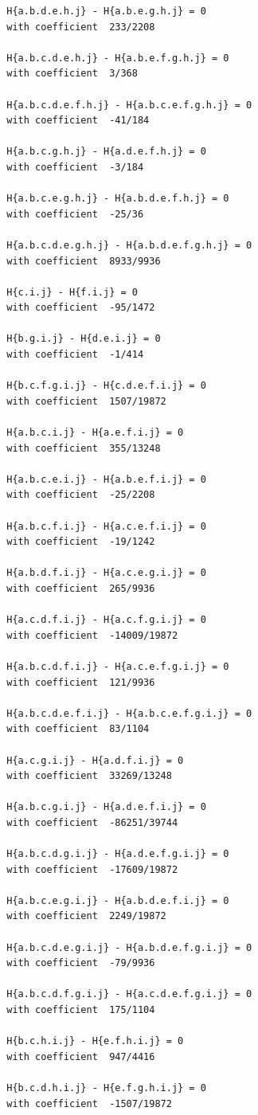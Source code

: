 \documentclass[11pt, a4paper]{kybernetika}
\begin{document}
\begin{verbatim}
		H{a.b.d.e.h.j} - H{a.b.e.g.h.j} = 0
		with coefficient  233/2208
		
		H{a.b.c.d.e.h.j} - H{a.b.e.f.g.h.j} = 0
		with coefficient  3/368
		
		H{a.b.c.d.e.f.h.j} - H{a.b.c.e.f.g.h.j} = 0
		with coefficient  -41/184
		
		H{a.b.c.g.h.j} - H{a.d.e.f.h.j} = 0
		with coefficient  -3/184
		
		H{a.b.c.e.g.h.j} - H{a.b.d.e.f.h.j} = 0
		with coefficient  -25/36
		
		H{a.b.c.d.e.g.h.j} - H{a.b.d.e.f.g.h.j} = 0
		with coefficient  8933/9936
		
		H{c.i.j} - H{f.i.j} = 0
		with coefficient  -95/1472
		
		H{b.g.i.j} - H{d.e.i.j} = 0
		with coefficient  -1/414
		
		H{b.c.f.g.i.j} - H{c.d.e.f.i.j} = 0
		with coefficient  1507/19872
		
		H{a.b.c.i.j} - H{a.e.f.i.j} = 0
		with coefficient  355/13248
		
		H{a.b.c.e.i.j} - H{a.b.e.f.i.j} = 0
		with coefficient  -25/2208
		
		H{a.b.c.f.i.j} - H{a.c.e.f.i.j} = 0
		with coefficient  -19/1242
		
		H{a.b.d.f.i.j} - H{a.c.e.g.i.j} = 0
		with coefficient  265/9936
		
		H{a.c.d.f.i.j} - H{a.c.f.g.i.j} = 0
		with coefficient  -14009/19872
		
		H{a.b.c.d.f.i.j} - H{a.c.e.f.g.i.j} = 0
		with coefficient  121/9936
		
		H{a.b.c.d.e.f.i.j} - H{a.b.c.e.f.g.i.j} = 0
		with coefficient  83/1104
		
		H{a.c.g.i.j} - H{a.d.f.i.j} = 0
		with coefficient  33269/13248
		
		H{a.b.c.g.i.j} - H{a.d.e.f.i.j} = 0
		with coefficient  -86251/39744
		
		H{a.b.c.d.g.i.j} - H{a.d.e.f.g.i.j} = 0
		with coefficient  -17609/19872
		
		H{a.b.c.e.g.i.j} - H{a.b.d.e.f.i.j} = 0
		with coefficient  2249/19872
		
		H{a.b.c.d.e.g.i.j} - H{a.b.d.e.f.g.i.j} = 0
		with coefficient  -79/9936
		
		H{a.b.c.d.f.g.i.j} - H{a.c.d.e.f.g.i.j} = 0
		with coefficient  175/1104
		
		H{b.c.h.i.j} - H{e.f.h.i.j} = 0
		with coefficient  947/4416
		
		H{b.c.d.h.i.j} - H{e.f.g.h.i.j} = 0
		with coefficient  -1507/19872
		

\end{verbatim}
\end{document}
